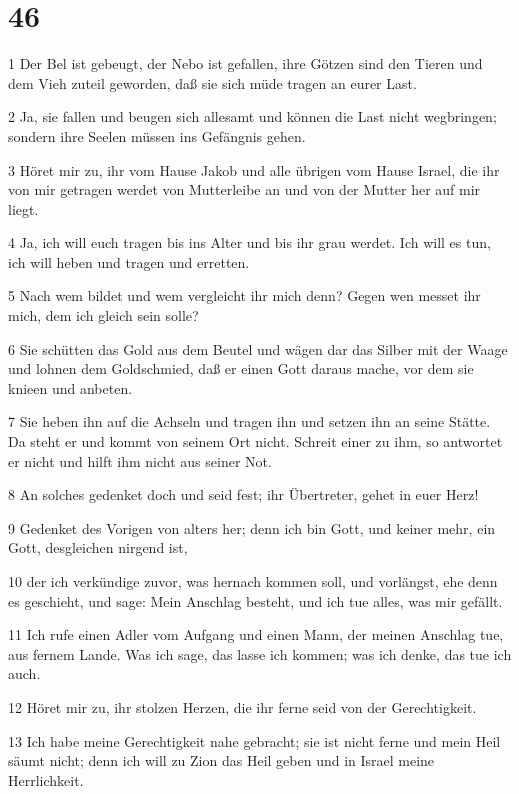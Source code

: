 \chapter{46}

\par 1 Der Bel ist gebeugt, der Nebo ist gefallen, ihre Götzen sind den Tieren und dem Vieh zuteil geworden, daß sie sich müde tragen an eurer Last.
\par 2 Ja, sie fallen und beugen sich allesamt und können die Last nicht wegbringen; sondern ihre Seelen müssen ins Gefängnis gehen.
\par 3 Höret mir zu, ihr vom Hause Jakob und alle übrigen vom Hause Israel, die ihr von mir getragen werdet von Mutterleibe an und von der Mutter her auf mir liegt.
\par 4 Ja, ich will euch tragen bis ins Alter und bis ihr grau werdet. Ich will es tun, ich will heben und tragen und erretten.
\par 5 Nach wem bildet und wem vergleicht ihr mich denn? Gegen wen messet ihr mich, dem ich gleich sein solle?
\par 6 Sie schütten das Gold aus dem Beutel und wägen dar das Silber mit der Waage und lohnen dem Goldschmied, daß er einen Gott daraus mache, vor dem sie knieen und anbeten.
\par 7 Sie heben ihn auf die Achseln und tragen ihn und setzen ihn an seine Stätte. Da steht er und kommt von seinem Ort nicht. Schreit einer zu ihm, so antwortet er nicht und hilft ihm nicht aus seiner Not.
\par 8 An solches gedenket doch und seid fest; ihr Übertreter, gehet in euer Herz!
\par 9 Gedenket des Vorigen von alters her; denn ich bin Gott, und keiner mehr, ein Gott, desgleichen nirgend ist,
\par 10 der ich verkündige zuvor, was hernach kommen soll, und vorlängst, ehe denn es geschieht, und sage: Mein Anschlag besteht, und ich tue alles, was mir gefällt.
\par 11 Ich rufe einen Adler vom Aufgang und einen Mann, der meinen Anschlag tue, aus fernem Lande. Was ich sage, das lasse ich kommen; was ich denke, das tue ich auch.
\par 12 Höret mir zu, ihr stolzen Herzen, die ihr ferne seid von der Gerechtigkeit.
\par 13 Ich habe meine Gerechtigkeit nahe gebracht; sie ist nicht ferne und mein Heil säumt nicht; denn ich will zu Zion das Heil geben und in Israel meine Herrlichkeit.

